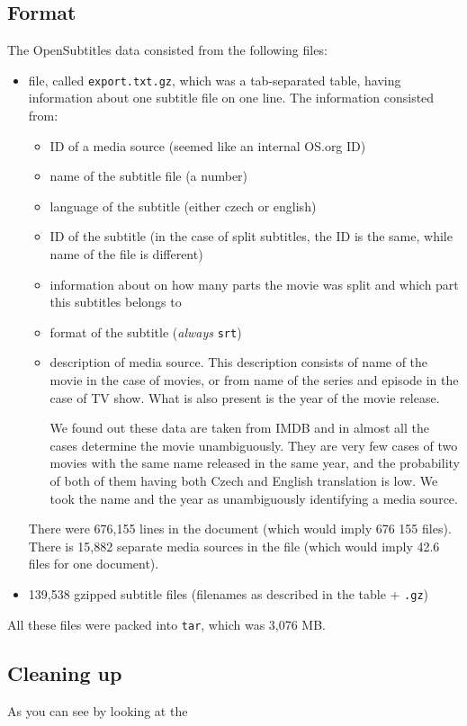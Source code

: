 \subsection*{Format}
The OpenSubtitles data consisted from the following files:
\begin{itemize}
    \item file, called \texttt{export.txt.gz}, which was a tab-separated table, having information about one subtitle file on one line. The information consisted from:
    \begin{itemize}
        \item ID of a media source (seemed like an internal OS.org ID)
        \item name of the subtitle file (a number)
        \item language of the subtitle (either czech or english)
        \item ID of the subtitle (in the case of split subtitles, the ID is the same, while name of the file is different)
        \item information about on how many parts the movie was split and which part this subtitles belongs to
        \item format of the subtitle (\emph{always} \texttt{srt})
        \item description of media source. This description consists of name of the movie in the case of movies, or from name of the series and episode in the case of TV show. What is also present is the year of the movie release.
        
         We found out these data are taken from IMDB and in almost all the cases determine the movie unambiguously. They are very few cases of two movies  with the same name released in the same year, and the probability of both of them having both Czech and English translation is low. We took the name and the year as unambiguously identifying a media source.
    \end{itemize}
    
    There were 676,155 lines in the document (which would imply 676 155 files). There is 15,882 separate media sources in the file (which would imply 42.6 files for one document).
    \item 139,538 gzipped subtitle files (filenames as described in the table + \texttt{.gz})
\end{itemize}
All these files were packed into \texttt{tar}, which was 3,076 MB.

\subsection*{Cleaning up}
As you can see by looking at the 

